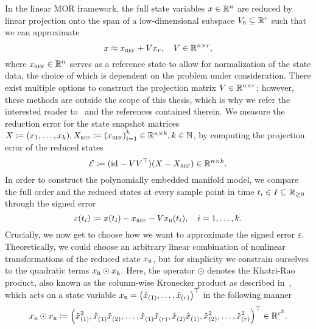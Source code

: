 In the linear MOR framework, the full state variables $x \in \mathbb{R}^n$ are reduced by linear projection onto the span of a low-dimensional subspace $V_{\textnormal{\scshape r}} \subseteq \mathbb{R}^r$ such that we can approximate
\begin{equation}\label{eq:linear-state-reduction}
    x \approx x_{\textnormal{\scshape ref}} + V x_r,\quad V \in \mathbb{R}^{n \times r},
\end{equation}
where $x_{\textnormal{\scshape ref}} \in \mathbb{R}^n$ serves as a reference state to allow for normalization of the state data, the choice of which is dependent on the problem under consideration.
There exist multiple options to construct the projection matrix $V \in \mathbb{R}^{n \times r}$; however, these methods are outside the scope of this thesis, which is why we refer the interested reader to~\cite{BOP2017, BCO2017} and the references contained therein.
We measure the reduction error for the state snapshot matrices $X \coloneqq (x_1, \dots, x_k), X_{\textnormal{\scshape ref}} \coloneqq {(x_{\textnormal{\scshape ref}})}_{i = 1}^k \in \mathbb{R}^{n \times k},k \in \mathbb{N}$, by computing the projection error of the reduced states
\begin{equation}
    \mathcal{E} \coloneqq (\text{id}_{} - V V^{\top}) (X - X_{\textnormal{\scshape ref}}) \in \mathbb{R}^{n \times k}.
\end{equation}
In order to construct the polynomially embedded manifold model, we compare the full order and the reduced states at every sample point in time $t_i \in I \subseteq \mathbb{R}_{\geq 0}$ through the signed error
\begin{equation}\label{eq:linear-signed-error}
    \varepsilon(t_i) \coloneqq x(t_i) - x_{\textnormal{\scshape ref}} - V x_{\textnormal{\scshape r}}(t_i),\quad i = 1, \dots, k.
\end{equation}
Crucially, we now get to choose how we want to approximate the signed error $\varepsilon$.
Theoretically, we could choose an arbitrary linear combination of nonlinear transformations of the reduced state $x_{\textnormal{\scshape r}}$, but for simplicity we constrain ourselves to the quadratic terms $x_{\textnormal{\scshape r}} \odot x_{\textnormal{\scshape r}}$.
Here, the operator $\odot$ denotes the Khatri-Rao product, also known as the column-wise Kronecker product as described in~\cite{Slyusar1999, Shuangzhe2008, Favier2021}, which acts on a state variable $x_{\textnormal{\scshape r}} = {\left( \hat{x}_{(1)}, \dots, \hat{x}_{(r)} \right)}^{\top}$ in the following manner
\begin{equation}\label{eq:redundant-khatri-rao}
    x_{\textnormal{\scshape r}} \odot x_{\textnormal{\scshape r}} \coloneqq {\left( \hat{x}_{(1)}^2, \hat{x}_{(1)}^{\phantom{1}} \hat{x}_{(2)}^{\phantom{1}}, \dots, \hat{x}_{(1)}^{\phantom{1}} \hat{x}_{(r)}^{\phantom{1}}, \hat{x}_{(2)}^{\phantom{1}} \hat{x}_{(1)}^{\phantom{1}}, \hat{x}_{(2)}^2, \dots, \hat{x}_{(r)}^2 \right)}^{\top} \in \mathbb{R}^{r^2}.
\end{equation}
